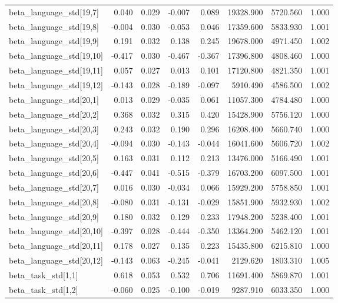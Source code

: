 \begin{tabular}{lrrrrrrr}
beta\_language\_std[19,7] & 0.040 & 0.029 & -0.007 & 0.089 & 19328.900 & 5720.560 & 1.000 \\
beta\_language\_std[19,8] & -0.004 & 0.030 & -0.053 & 0.046 & 17359.600 & 5833.930 & 1.001 \\
beta\_language\_std[19,9] & 0.191 & 0.032 & 0.138 & 0.245 & 19678.000 & 4971.450 & 1.002 \\
beta\_language\_std[19,10] & -0.417 & 0.030 & -0.467 & -0.367 & 17396.800 & 4808.460 & 1.000 \\
beta\_language\_std[19,11] & 0.057 & 0.027 & 0.013 & 0.101 & 17120.800 & 4821.350 & 1.001 \\
beta\_language\_std[19,12] & -0.143 & 0.028 & -0.189 & -0.097 & 5910.490 & 4586.500 & 1.002 \\
beta\_language\_std[20,1] & 0.013 & 0.029 & -0.035 & 0.061 & 11057.300 & 4784.480 & 1.000 \\
beta\_language\_std[20,2] & 0.368 & 0.032 & 0.315 & 0.420 & 15428.900 & 5756.120 & 1.000 \\
beta\_language\_std[20,3] & 0.243 & 0.032 & 0.190 & 0.296 & 16208.400 & 5660.740 & 1.000 \\
beta\_language\_std[20,4] & -0.094 & 0.030 & -0.143 & -0.044 & 16041.600 & 5606.720 & 1.002 \\
beta\_language\_std[20,5] & 0.163 & 0.031 & 0.112 & 0.213 & 13476.000 & 5166.490 & 1.001 \\
beta\_language\_std[20,6] & -0.447 & 0.041 & -0.515 & -0.379 & 16703.200 & 6097.500 & 1.001 \\
beta\_language\_std[20,7] & 0.016 & 0.030 & -0.034 & 0.066 & 15929.200 & 5758.850 & 1.001 \\
beta\_language\_std[20,8] & -0.080 & 0.031 & -0.131 & -0.029 & 15851.900 & 5932.930 & 1.002 \\
beta\_language\_std[20,9] & 0.180 & 0.032 & 0.129 & 0.233 & 17948.200 & 5238.400 & 1.001 \\
beta\_language\_std[20,10] & -0.397 & 0.028 & -0.444 & -0.350 & 13364.200 & 5462.120 & 1.001 \\
beta\_language\_std[20,11] & 0.178 & 0.027 & 0.135 & 0.223 & 15435.800 & 6215.810 & 1.000 \\
beta\_language\_std[20,12] & -0.143 & 0.063 & -0.245 & -0.041 & 2129.620 & 1803.310 & 1.005 \\
beta\_task\_std[1,1] & 0.618 & 0.053 & 0.532 & 0.706 & 11691.400 & 5869.870 & 1.001 \\
beta\_task\_std[1,2] & -0.060 & 0.025 & -0.100 & -0.019 & 9287.910 & 6033.350 & 1.000 \\

\end{tabular}
